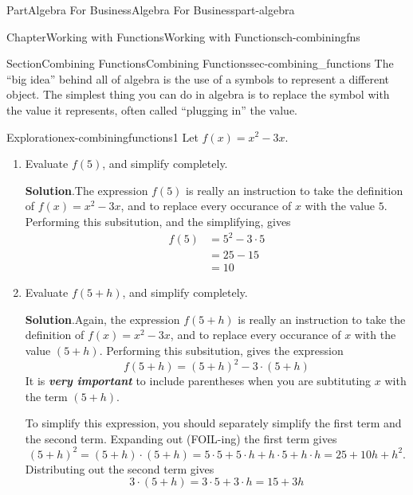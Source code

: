 \documentclass{tufte-book}
\newcommand{\blocktitlefont}{\relax}
\newcommand{\alert}[1]{\textbf{\textit{#1}}}
\numberwithin{equation}{chapter}
\newcommand{\amp}{&}
\begin{document}
\begin{partptx}{Part}{Algebra For Business}{}{Algebra For Business}{}{}{part-algebra}
\begin{chapterptx}{Chapter}{Working with Functions}{}{Working with Functions}{}{}{ch-combiningfns}
%
\begin{sectionptx}{Section}{Combining Functions}{}{Combining Functions}{}{}{sec-combining_functions}
The ``big idea'' behind all of algebra is the use of a symbols to represent a different object. The simplest thing you can do in algebra is to replace the symbol with the value it represents, often called ``plugging in''  the value.%
\begin{exploration}{Exploration}{}{ex-combiningfunctions1}%
Let \(f(x) = x^2 - 3x\).%
\begin{enumerate}[font=\bfseries,label=(\alph*),ref=\alph*]%
\item{}Evaluate \(f(5)\), and simplify completely.%
\par\smallskip%
\noindent\textbf{\blocktitlefont Solution}.\hypertarget{ex-combiningfunctions1-2-2}{}\quad{}The expression \(f(5)\) is really an instruction to take the definition of \(f(x) = x^2 - 3x\), and to replace every occurance of \(x\) with the value \(5\).  Performing this subsitution, and the simplifying, gives%
\begin{align*}
f(5) \amp= 5^2 - 3\cdot 5\\
\amp= 25 - 15\\
\amp= 10
\end{align*}
%
\item{}Evaluate \(f(5+h)\), and simplify completely.%
\par\smallskip%
\noindent\textbf{\blocktitlefont Solution}.\hypertarget{ex-combiningfunctions1-3-2}{}\quad{}Again, the expression \(f(5+h)\) is really an instruction to take the definition of \(f(x) = x^2 - 3x\), and to replace every occurance of \(x\) with the value \((5+h)\).  Performing this subsitution, gives the expression%
\begin{equation*}
f(5+h) = (5+h)^2 - 3\cdot (5+h)
\end{equation*}
It is \alert{very important} to include parentheses when you are subtituting \(x\) with the term \((5+h)\).%
\par
To simplify this expression, you should separately simplify the first term and the second term.  Expanding out (FOIL-ing) the first term gives%
\begin{equation*}
(5+h)^2 = (5+h)\cdot(5+h) = 5\cdot 5 + 5\cdot h + h\cdot 5 + h\cdot h = 25 + 10h +h^2\text{.}
\end{equation*}
Distributing out the second term gives%
\begin{equation*}
3\cdot (5+h) = 3\cdot 5 + 3\cdot h = 15 + 3h
\end{equation*}

\end{enumerate}
\end{exploration}
\end{sectionptx}
\end{chapterptx}
\end{partptx}
\end{document}
